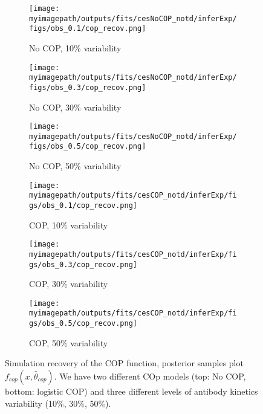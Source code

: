 \begin{figure}[H]

    \centering
    \begin{subfigure}{0.31\textwidth}
        \centering
        \texttt{[image: \\myimagepath/outputs/fits/cesNoCOP\_notd/inferExp/figs/obs\_0.1/cop\_recov.png]}
        \caption{No COP, 10\% variability}
    \end{subfigure}
    \begin{subfigure}{0.31\textwidth}
        \centering
        \texttt{[image: \\myimagepath/outputs/fits/cesNoCOP\_notd/inferExp/figs/obs\_0.3/cop\_recov.png]}
        \caption{No COP, 30\% variability}
    \end{subfigure}
    \begin{subfigure}{0.31\textwidth}
        \centering
        \texttt{[image: \\myimagepath/outputs/fits/cesNoCOP\_notd/inferExp/figs/obs\_0.5/cop\_recov.png]}
        \caption{No COP, 50\% variability}
    \end{subfigure}
    
  \begin{subfigure}{0.31\textwidth}
        \centering
        \texttt{[image: \\myimagepath/outputs/fits/cesCOP\_notd/inferExp/figs/obs\_0.1/cop\_recov.png]}
        \caption{ COP, 10\% variability}
    \end{subfigure}
    \begin{subfigure}{0.31\textwidth}
        \centering
        \texttt{[image: \\myimagepath/outputs/fits/cesCOP\_notd/inferExp/figs/obs\_0.3/cop\_recov.png]}
        \caption{ COP, 30\% variability}
    \end{subfigure}
    \begin{subfigure}{0.31\textwidth}
        \centering
        \texttt{[image: \\myimagepath/outputs/fits/cesCOP\_notd/inferExp/figs/obs\_0.5/cop\_recov.png]}
        \caption{ COP, 50\% variability}
    \end{subfigure}
    
    \caption{Simulation recovery of the COP function, posterior samples plot  $f_{cop}(x, \hat{\theta}_{cop})$. We have two different COp models (top: No COP, bottom: logistic COP) and three different levels of antibody kinetics variability (10\%, 30\%, 50\%). \label{fit2:cop}}
\end{figure}



